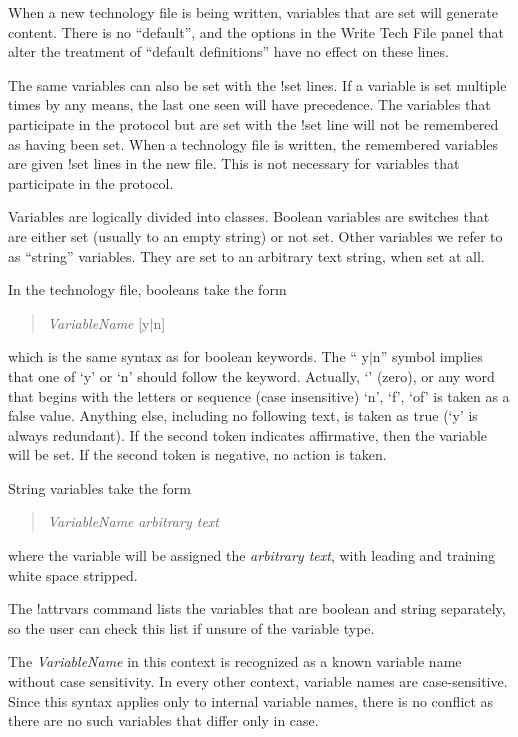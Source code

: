 When a new technology file is being written, variables that are set
will generate content.  There is no ``default'', and the options in
the {\cb Write Tech File} panel that alter the treatment of ``default
definitions'' have no effect on these lines.

The same variables can also be set with the {\vt !set} lines.  If a
variable is set multiple times by any means, the last one seen will
have precedence.  The variables that participate in the protocol but
are set with the {\vt !set} line will not be remembered as having been
set.  When a technology file is written, the remembered variables are
given {\vt !set} lines in the new file.  This is not necessary for
variables that participate in the protocol.

Variables are logically divided into classes.  Boolean variables are
switches that are either set (usually to an empty string) or not set. 
Other variables we refer to as ``string'' variables.  They are set to
an arbitrary text string, when set at all.

In the technology file, booleans take the form
\begin{quote}
{\it VariableName} [{\vt y}$|${\vt n}]
\end{quote}
which is the same syntax as for boolean keywords.  The ``{\vt
y}$|${\vt n}'' symbol implies that one of `{\vt y}' or `{\vt n}'
should follow the keyword.  Actually, `{}' (zero), or any word
that begins with the letters or sequence (case insensitive) `{\vt n}',
`{\vt f}', `{\vt of}' is taken as a false value.  Anything else,
including no following text, is taken as true (`{\vt y}' is always
redundant).  If the second token indicates affirmative, then the
variable will be set.  If the second token is negative, no action is
taken.

String variables take the form
\begin{quote}
{\it VariableName} {\it arbitrary text}
\end{quote}
where the variable will be assigned the {\it arbitrary text\/}, with
leading and training white space stripped.

The {\cb !attrvars} command lists the variables that are boolean and
string separately, so the user can check this list if unsure of the
variable type.

The {\it VariableName} in this context is recognized as a known
variable name without case sensitivity.  In every other context,
variable names are case-sensitive.  Since this syntax applies only to
internal variable names, there is no conflict as there are no such
variables that differ only in case.


